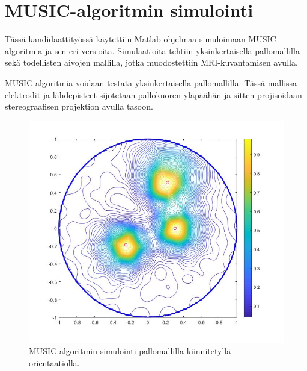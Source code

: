 \section{MUSIC-algoritmin simulointi}
Tässä kandidaattityössä käytettiin Matlab-ohjelmaa simuloimaan MUSIC-algoritmia ja sen eri versioita. Simulaatioita tehtiin yksinkertaisella pallomallilla sekä todellisten aivojen mallilla, jotka muodostettiin MRI-kuvantamisen avulla.

MUSIC-algoritmia voidaan testata yksinkertaisella pallomallilla. Tässä mallissa elektrodit ja lähdepisteet sijotetaan pallokuoren yläpäähän ja sitten projisoidaan stereograafisen projektion avulla tasoon.



\clearpage
\begin{figure}[h]
    \centering
    \includegraphics[scale=0.38]{mfix.jpg}
    \caption{MUSIC-algoritmin simulointi pallomallilla kiinnitetyllä orientaatiolla.}
    \label{fig:mfix}
\end{figure}

